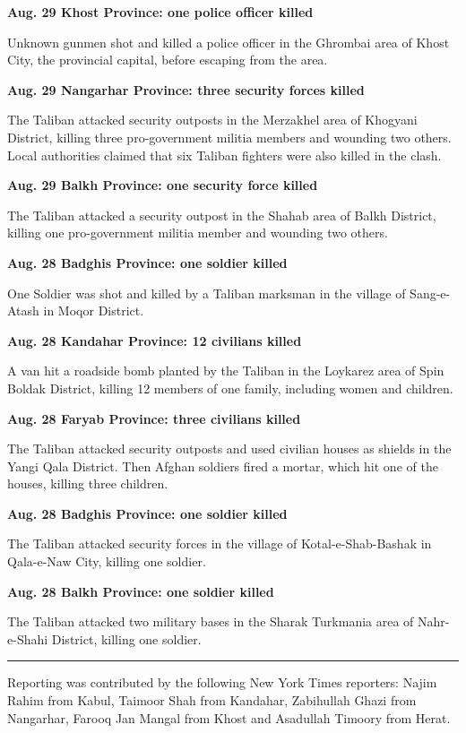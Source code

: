 \textbf{Aug. 29 Khost Province: one police officer killed}

Unknown gunmen shot and killed a police officer in the Ghrombai area of
Khost City, the provincial capital, before escaping from the area.

\textbf{Aug. 29 Nangarhar Province: three security forces killed}

The Taliban attacked security outposts in the Merzakhel area of Khogyani
District, killing three pro-government militia members and wounding two
others. Local authorities claimed that six Taliban fighters were also
killed in the clash.

\textbf{Aug. 29 Balkh Province: one security force killed}

The Taliban attacked a security outpost in the Shahab area of Balkh
District, killing one pro-government militia member and wounding two
others.

\textbf{Aug. 28 Badghis Province: one soldier killed}

One Soldier was shot and killed by a Taliban marksman in the village of
Sang-e-Atash in Moqor District.

\textbf{Aug. 28 Kandahar Province: 12 civilians killed}

A van hit a roadside bomb planted by the Taliban in the Loykarez area of
Spin Boldak District, killing 12 members of one family, including women
and children.

\textbf{Aug. 28 Faryab Province: three civilians killed}

The Taliban attacked security outposts and used civilian houses as
shields in the Yangi Qala District. Then Afghan soldiers fired a mortar,
which hit one of the houses, killing three children.

\textbf{Aug. 28 Badghis Province: one soldier killed}

The Taliban attacked security forces in the village of
Kotal-e-Shab-Bashak in Qala-e-Naw City, killing one soldier.

\textbf{Aug. 28 Balkh Province: one soldier killed}

The Taliban attacked two military bases in the Sharak Turkmania area of
Nahr-e-Shahi District, killing one soldier.

\begin{center}\rule{0.5\linewidth}{\linethickness}\end{center}

Reporting was contributed by the following New York Times reporters:
Najim Rahim from Kabul, Taimoor Shah from Kandahar, Zabihullah Ghazi
from Nangarhar, Farooq Jan Mangal from Khost and Asadullah Timoory from
Herat.

